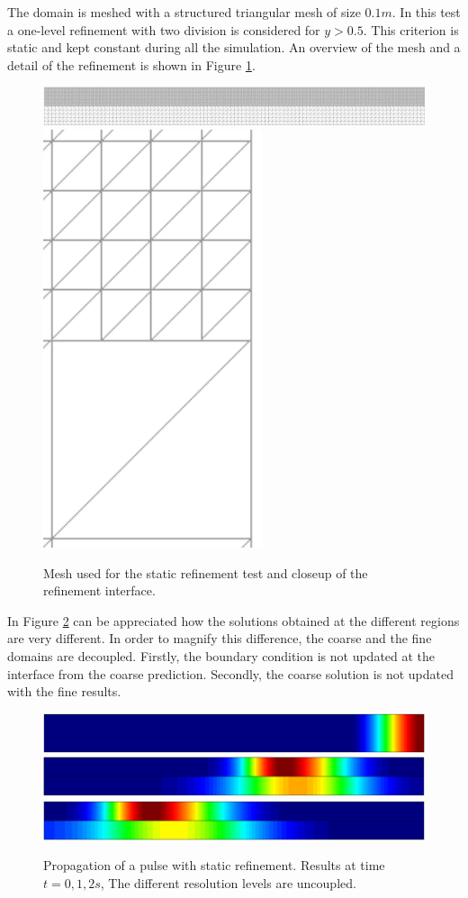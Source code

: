 The domain is meshed with a structured triangular mesh of size $0.1m$. In this test a one-level refinement with two division is considered for $y>0.5$. This criterion is static and kept constant during all the simulation. An overview of the mesh and a detail of the refinement is shown in Figure \ref{multilevel_static_mesh}.

\begin{figure} [htb]
    \centering
    \includegraphics[width=.92\textwidth]{img/multigrid/static/mesh}
    \hfill
    \includegraphics[width=.05\textwidth]{img/multigrid/static/mesh_detail_2}
    \caption{Mesh used for the static refinement test and closeup of the refinement interface.}
    \label{multilevel_static_mesh}
\end{figure}


In Figure \ref{multilevel_static_decoupled} can be appreciated how the solutions obtained at the different regions are very different. In order to magnify this difference, the coarse and the fine domains are decoupled. Firstly, the boundary condition is not updated at the interface from the coarse prediction. Secondly, the coarse solution is not updated with the fine results.


\begin{figure} [htb]
    \centering
    \includegraphics[width=\textwidth]{img/multigrid/static/decoupled-0}\\
    \vspace{5pt}
    \includegraphics[width=\textwidth]{img/multigrid/static/decoupled-1}\\
    \vspace{5pt}
    \includegraphics[width=\textwidth]{img/multigrid/static/decoupled-2}
    \caption{Propagation of a pulse with static refinement. Results at time $t=0,1,2s$, The different resolution levels are uncoupled.}
    \label{multilevel_static_decoupled}
\end{figure}


